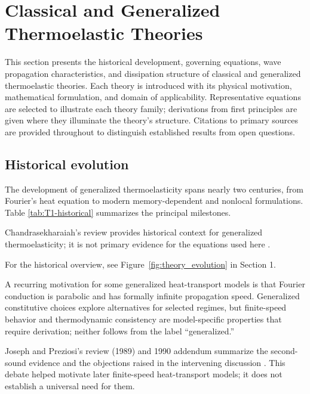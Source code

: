 \section{Classical and Generalized Thermoelastic Theories}
\label{sec:thermoelastic}

This section presents the historical development, governing equations, wave propagation characteristics, and dissipation structure of classical and generalized thermoelastic theories. Each theory is introduced with its physical motivation, mathematical formulation, and domain of applicability. Representative equations are selected to illustrate each theory family; derivations from first principles are given where they illuminate the theory's structure. Citations to primary sources are provided throughout to distinguish established results from open questions.

\subsection{Historical evolution}
\label{sec:4.1}

The development of generalized thermoelasticity spans nearly two centuries, from Fourier's heat equation to modern memory-dependent and nonlocal formulations. Table \ref{tab:T1-historical} summarizes the principal milestones.

Chandrasekharaiah’s review provides historical context for generalized thermoelasticity; it is not primary evidence for the equations used here \cite{Chandrasekharaiah1998}.



For the historical overview, see Figure~\ref{fig:theory_evolution} in Section 1.

A recurring motivation for some generalized heat-transport models is that Fourier conduction is parabolic and has formally infinite propagation speed. Generalized constitutive choices explore alternatives for selected regimes, but finite-speed behavior and thermodynamic consistency are model-specific properties that require derivation; neither follows from the label “generalized.”

Joseph and Preziosi's review (1989) and 1990 addendum summarize the second-sound evidence and the objections raised in the intervening discussion \cite{Joseph1989,Joseph1990}. This debate helped motivate later finite-speed heat-transport models; it does not establish a universal need for them.

